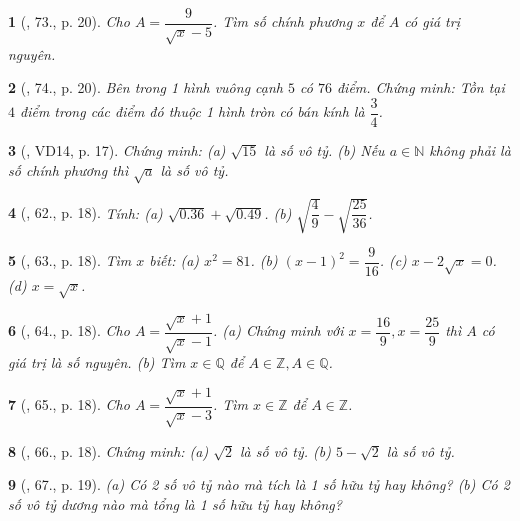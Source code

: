 \documentclass{article}
\newtheorem{baitoan}{}
\begin{document}
\begin{baitoan}[\cite{Tuyen_Toan_7}, 73., p. 20]
	Cho $A = \dfrac{9}{\sqrt{x} - 5}$. Tìm số chính phương $x$ để $A$ có giá trị nguyên.
\end{baitoan}

\begin{baitoan}[\cite{Tuyen_Toan_7}, 74., p. 20]
	Bên trong 1 hình vuông cạnh $5$ có $76$ điểm. Chứng minh: Tồn tại $4$ điểm trong các điểm đó thuộc 1 hình tròn có bán kính là $\dfrac{3}{4}$.
\end{baitoan}

\begin{baitoan}[\cite{Binh_Toan_7_tap_1}, VD14, p. 17]
	Chứng minh: (a) $\sqrt{15}$ là số vô tỷ. (b) Nếu $a\in\mathbb{N}$ không phải là số chính phương thì $\sqrt{a}$ là số vô tỷ.	
\end{baitoan}

\begin{baitoan}[\cite{Binh_Toan_7_tap_1}, 62., p. 18]
	Tính: (a) $\sqrt{0.36} + \sqrt{0.49}$. (b) $\sqrt{\dfrac{4}{9}} - \sqrt{\dfrac{25}{36}}$.
\end{baitoan}

\begin{baitoan}[\cite{Binh_Toan_7_tap_1}, 63., p. 18]
	Tìm $x$ biết: (a) $x^2 = 81$. (b) $(x - 1)^2 = \dfrac{9}{16}$. (c) $x - 2\sqrt{x} = 0$. (d) $x = \sqrt{x}$.	
\end{baitoan}

\begin{baitoan}[\cite{Binh_Toan_7_tap_1}, 64., p. 18]
	Cho $A = \dfrac{\sqrt{x} + 1}{\sqrt{x} - 1}$. (a) Chứng minh với $x = \dfrac{16}{9},x = \dfrac{25}{9}$ thì $A$ có giá trị là số nguyên. (b) Tìm $x\in\mathbb{Q}$ để $A\in\mathbb{Z},A\in\mathbb{Q}$.
\end{baitoan}

\begin{baitoan}[\cite{Binh_Toan_7_tap_1}, 65., p. 18]
	Cho $A = \dfrac{\sqrt{x} + 1}{\sqrt{x} - 3}$. Tìm $x\in\mathbb{Z}$ để $A\in\mathbb{Z}$.
\end{baitoan}

\begin{baitoan}[\cite{Binh_Toan_7_tap_1}, 66., p. 18]
	Chứng minh: (a) $\sqrt{2}$ là số vô tỷ. (b) $5 - \sqrt{2}$ là số vô tỷ.	
\end{baitoan}

\begin{baitoan}[\cite{Binh_Toan_7_tap_1}, 67., p. 19]
	(a) Có 2 số vô tỷ nào mà tích là 1 số hữu tỷ hay không? (b) Có 2 số vô tỷ dương nào mà tổng là 1 số hữu tỷ hay không?	
\end{baitoan}
\end{document}
